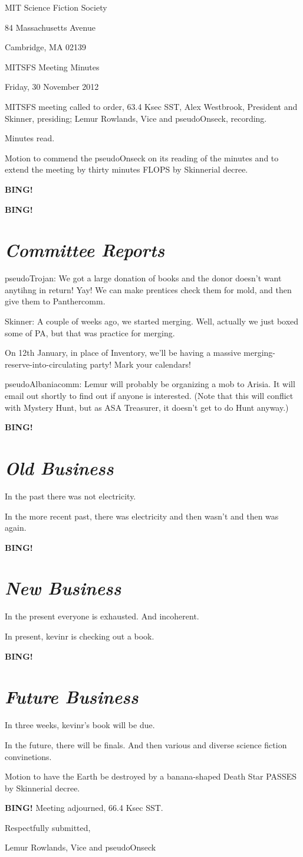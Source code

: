 \documentclass[10pt]{article}
\newcommand{\bing}{{\bf BING!} }
\newcommand{\goto}[1]{\bing \vskip 12pt \section*{{\em{#1}}}}
\newcommand{\skinner}{Alex Westbrook, President and Skinner}
\newcommand{\onseck}{Lemur Rowlands, Vice and pseudoOnseck}
\newcommand{\meetingdate}{Friday, 30 November 2012}
\begin{document}
\begin{center}

MIT Science Fiction Society

84 Massachusetts Avenue

Cambridge, MA 02139

\vspace{12pt}

MITSFS Meeting Minutes

\meetingdate

\end{center}

\vspace{18pt}

\setlength{\parskip}{6pt}

\noindent
MITSFS meeting called to order, 63.4 Ksec SST,
\skinner, presiding; \onseck, recording.

Minutes read.

Motion to commend the pseudoOnseck on its reading of the minutes
and to extend the meeting by thirty minutes FLOPS by Skinnerial decree.

\bing

\goto{Committee Reports}

pseudoTrojan: We got a large donation of books and the donor doesn't want anytihng in return!  Yay!  We can make prentices check them for mold, and then give them to Panthercomm.

Skinner: A couple of weeks ago, we started merging.  Well, actually we just boxed some of PA, but that was practice for merging.

On 12th January, in place of Inventory, we'll be having a massive merging-reserve-into-circulating party!  Mark your calendars!

pseudoAlbaniacomm: Lemur will probably be organizing a mob to Arisia.  It will email out shortly to find out if anyone is interested.  (Note that this will conflict with Mystery Hunt, but as ASA Treasurer, it doesn't get to do Hunt anyway.)

\goto{Old Business}

In the past there was not electricity.

In the more recent past, there was electricity and then wasn't and then was again.

\goto{New Business}

In the present everyone is exhausted.  And incoherent.

In present, kevinr is checking out a book.


\goto{Future Business}

In three weeks, kevinr's book will be due.

In the future, there will be finals.  And then various and diverse science fiction convinetions.

Motion to have the Earth be destroyed by a banana-shaped Death Star PASSES by Skinnerial decree.

\bing
\noindent
Meeting adjourned, 66.4 Ksec SST.

\vspace{18pt}

\centerline{Respectfully submitted,}
\centerline{\onseck}
\end{document}
